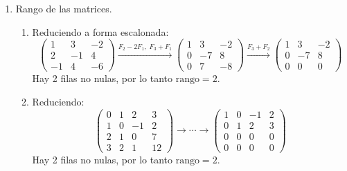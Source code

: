 \documentclass[12pt,letterpaper]{article}
\begin{document}
\begin{enumerate}
\begin{enumerate}
    \textbf{Espacio fila:} $\mathcal{B}_{\text{fila}} = \{(2,-1,3)\}$

    \textbf{Espacio columna:} $\mathcal{B}_{\text{col}} = \left\{\begin{pmatrix}2\\4\end{pmatrix}\right\}$

    \textbf{Espacio nulo:} Variables libres $x_2 = s$, $x_3 = t$:
    \[
    x_1 = \tfrac{1}{2}s - \tfrac{3}{2}t \quad \Rightarrow \quad \mathcal{B}_{\text{nulo}} = \{(1,2,0),\;(-3,0,2)\}
    \]

    \textbf{Verificación:} $1 + 2 = 3 = n$ \checkmark

\end{enumerate}

\newpage
\item Rango de las matrices.

\begin{enumerate}

    \item Reduciendo a forma escalonada:
    \[
    \begin{pmatrix} 1 & 3 & -2 \\ 2 & -1 & 4 \\ -1 & 4 & -6 \end{pmatrix}
    \xrightarrow{F_2-2F_1,\;F_3+F_1}
    \begin{pmatrix} 1 & 3 & -2 \\ 0 & -7 & 8 \\ 0 & 7 & -8 \end{pmatrix}
    \xrightarrow{F_3+F_2}
    \begin{pmatrix} 1 & 3 & -2 \\ 0 & -7 & 8 \\ 0 & 0 & 0 \end{pmatrix}
    \]
    Hay 2 filas no nulas, por lo tanto $\text{rango} = 2$.

    \item Reduciendo:
    \[
    \begin{pmatrix} 0 & 1 & 2 & 3 \\ 1 & 0 & -1 & 2 \\ 2 & 1 & 0 & 7 \\ 3 & 2 & 1 & 12 \end{pmatrix}
    \longrightarrow \cdots \longrightarrow
    \begin{pmatrix} 1 & 0 & -1 & 2 \\ 0 & 1 & 2 & 3 \\ 0 & 0 & 0 & 0 \\ 0 & 0 & 0 & 0 \end{pmatrix}
    \]
    Hay 2 filas no nulas, por lo tanto $\text{rango} = 2$.


\end{enumerate}
\end{enumerate}
\end{document}
